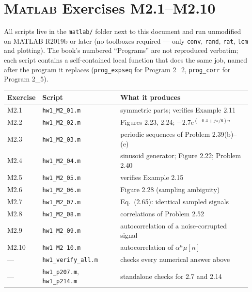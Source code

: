 \section{\textsc{Matlab} Exercises M2.1--M2.10}

All scripts live in the \texttt{matlab/} folder next to this document and run
unmodified on MATLAB R2019b or later (no toolboxes required --- only
\texttt{conv}, \texttt{rand}, \texttt{rat}, \texttt{lcm} and plotting).
The book's numbered ``Programs'' are not reproduced verbatim; each script contains a
self-contained local function that does the same job, named after the program it replaces
(\texttt{prog\_expseq} for Program 2\_2, \texttt{prog\_corr} for Program 2\_5).

\begin{center}
\small
\renewcommand{\arraystretch}{1.25}
\begin{tabular}{@{}lll@{}}
\toprule
Exercise & Script & What it produces\\
\midrule
M2.1  & \texttt{hw1\_M2\_01.m} & symmetric parts; verifies Example 2.11\\
M2.2  & \texttt{hw1\_M2\_02.m} & Figures 2.23, 2.24; $-2.7e^{(-0.4+j\pi/6)n}$\\
M2.3  & \texttt{hw1\_M2\_03.m} & periodic sequences of Problem 2.39(b)--(e)\\
M2.4  & \texttt{hw1\_M2\_04.m} & sinusoid generator; Figure 2.22; Problem 2.40\\
M2.5  & \texttt{hw1\_M2\_05.m} & verifies Example 2.15\\
M2.6  & \texttt{hw1\_M2\_06.m} & Figure 2.28 (sampling ambiguity)\\
M2.7  & \texttt{hw1\_M2\_07.m} & Eq.\ (2.65): identical sampled signals\\
M2.8  & \texttt{hw1\_M2\_08.m} & correlations of Problem 2.52\\
M2.9  & \texttt{hw1\_M2\_09.m} & autocorrelation of a noise-corrupted signal\\
M2.10 & \texttt{hw1\_M2\_10.m} & autocorrelation of $\alpha^{n}\mu[n]$\\
\midrule
--- & \texttt{hw1\_verify\_all.m} & checks every numerical answer above\\
--- & \texttt{hw1\_p207.m}, \texttt{hw1\_p214.m} & standalone checks for 2.7 and 2.14\\
\bottomrule
\end{tabular}
\end{center}


